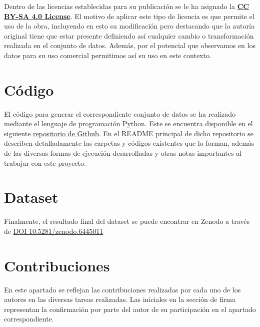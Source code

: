 Dentro de las licencias establecidas para su publicación se le ha asignado la \textbf{\href{https://creativecommons.org/licenses/by-sa/4.0/deed.es}{CC BY-SA 4.0 License}}. El motivo de aplicar 
este tipo de licencia es que permite el uso de la obra, incluyendo en esto su modificación pero destacando que la autoría 
original tiene que estar presente definiendo así cualquier cambio o transformación realizada en el conjunto de datos. Además, 
por el potencial que observamos en los datos para su uso comercial permitimos así su uso en este contexto.

\section{Código}

El código para generar el correspondiente conjunto de datos se ha realizado mediante el lenguaje de programación Python. 
Este se encuentra disponible en el siguiente \href{https://github.com/jvruoc/rent_prices}{repositorio de Github}. 
En el README principal de dicho repositorio se describen detalladamente las carpetas y códigos existentes que lo 
forman, además de las diversas formas de ejecución desarrolladas y otras notas importantes al trabajar con este proyecto.

\section{Dataset}

Finalmente, el resultado final del dataset se puede encontrar en Zenodo a través 
de \href{https://doi.org/10.5281/zenodo.6445011}{DOI 10.5281/zenodo.6445011}

\section{Contribuciones}

En este apartado se reflejan las contribuciones realizadas por cada uno de 
los autores en las diversas tareas realizadas. Las iniciales en la sección 
de firma representan la confirmación por parte del autor de su participación 
en el apartado correspondiente.

